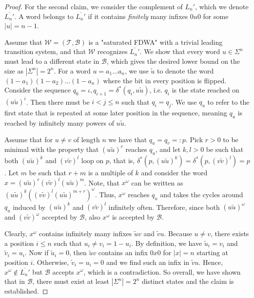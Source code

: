 \documentclass[a4paper,USenglish,cleveref,autoref,thm-restate]{lipics-v2021}
\newcommand{\mc}[1]{\ensuremath{\mathcal{#1}}}
\newcommand{\T}{\mc{T}}
\newcommand{\B}{\mc{B}}
\newcommand{\W}{\mc{W}}
\begin{document}
{\begin{proof}
  \newcommand{\Lc}{\ensuremath{\overline{L_n'}}}
  For the second claim, we consider the complement of $L_n'$, which we denote $\Lc$.
  A word belongs to $\Lc$ if it contains \emph{finitely} many infixes $0u0$ for some $|u| = n-1$.
  
  Assume that $\W = (\T, \B)$ is a "saturated FDWA" with a trivial leading transition system, and that $\W$ recognizes $\Lc$.
  We show that every word $u \in \Sigma^n$ must lead to a different state in $\B$, which gives the desired lower bound on the size as $|\Sigma^n| = 2^n$.
  For a word $u = a_1\dotsc a_n$, we use $\tilde{u}$ to denote the word $(1-a_1)(1-a_2)\dots(1-a_n)$ where the bit in every position is flipped.
  Consider the sequence $q_0 = \iota, q_{i+1} = \delta^*(q_i, u\tilde{u})$, i.e. $q_i$ is the state reached on $(u\tilde{u})^i$.
  Then there must be $i < j \leq n$ such that $q_i = q_j$.
  We use $q_u$ to refer to the first state that is repeated at some later position in the sequence, meaning $q_u$ is reached by infinitely many powers of $u\tilde{u}$.

  Assume that for $u \neq v$ of length $n$ we have that $q_u = q_v =: p$.
  Pick $r > 0$ to be minimal with the property that $(u\tilde{u})^r$ reaches $q_u$, and let $k,l > 0$ be such that both $(u\tilde{u})^k$ and $(v\tilde{v})^l$ loop on $p$, that is, $\delta^*(p,(u\tilde{u})^k) = \delta^*(p,(v\tilde{v})^l) = p$.
  Let $m$ be such that $r+m$ is a multiple of $k$ and consider the word $x = (u\tilde{u})^r(v\tilde{v})^l(u\tilde{u})^m$.
  Note, that $x^\omega$ can be written as $(u\tilde{u})^k\left((v\tilde{v})^l(u\tilde{u})^{m+r}\right)^\omega$.
  Thus, $x^\omega$ reaches $q_u$ and takes the cycles around $q_u$ induced by $(u\tilde{u})^k$ and $(v\tilde{v})^l$ infinitely often.
  Therefore, since both $(u\tilde{u})^\omega$ and $(v\tilde{v})^\omega$ accepted by $\B$, also $x^\omega$ is accepted by $\B$.

  Clearly, $x^\omega$ contains infinitely many infixes $\tilde{u}v$ and $\tilde{v}u$.
  Because $u \neq v$, there exists a position $i \leq n$ such that $u_i \neq v_i = 1 - u_i$.
  By definition, we have $\tilde{u}_i = v_i$ and $\tilde{v}_i = u_i$.
  Now if $\tilde{u}_i = 0$, then $\tilde{u}v$ contains an infix $0x0$ for $|x| = n$ starting at position $i$.
  Otherwise, $\tilde{v}_i = u_i = 0$ and we find such an infix in $\tilde{v}u$.
  Hence, $x^\omega \notin \Lc$ but $\B$ accepts $x^\omega$, which is a contradiction.
  So overall, we have shown that in $\B$, there must exist at least $|\Sigma^n| = 2^n$ distinct states and the claim is established.


\end{proof}}
\end{document}
